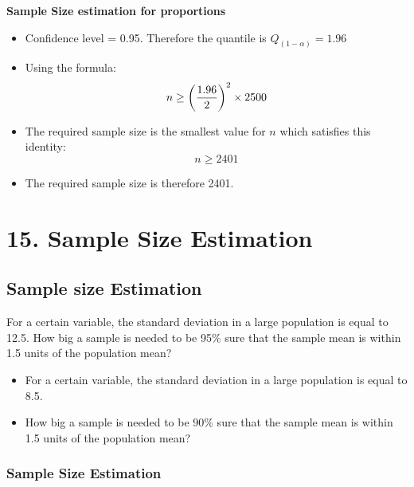 
\textbf{Sample Size estimation for proportions}

\begin{itemize}
\item  Confidence level = 0.95. Therefore the quantile is $Q_{(1-\alpha)} = 1.96$
\item  Using the formula: \[ n \geq \left({1.96 \over 2 }\right)^2 \times 2500  \]
\item  The required sample size is the smallest value for $n$ which satisfies this identity: \[ n \geq 2401  \]
\item  The required sample size is therefore 2401.
\end{itemize}








\chapter{15. Sample Size Estimation}

\section{Sample size Estimation}
For a certain variable, the standard deviation in a large population is equal to 12.5.
How big a sample is needed to be 95\% sure that the sample mean is within 1.5 units of the population mean?


\begin{itemize}
\item For a certain variable, the standard deviation in a large population is equal to 8.5.
\item How big a sample is needed to be 90\% sure that the sample mean is within 1.5
units of the population mean?
\end{itemize}


\subsection{Sample Size Estimation}

